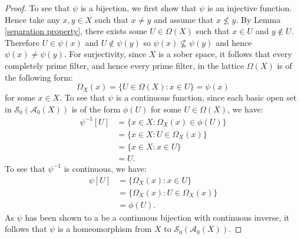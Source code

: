 \documentclass{amsart}
\theoremstyle{plain}
\theoremstyle{definition}
\begin{document}
\begin{proof}
    To see that $\psi$ is a bijection, we first show that $\psi$ is an injective function. Hence take any $x,y\in X$ such that $x\not=y$ and assume that $x\not\leqslant y$. By Lemma \ref{separation property}, there exists some $U\in\Omega(X)$ such that $x\in U$ and $y\not\in U$. Therefore $U\in\psi(x)$ and $U\not\in\psi(y)$ so $\psi(x)\not\subseteq\psi(y)$ and hence $\psi(x)\not=\psi(y)$. For surjectivity, since $X$ is a sober space, it follows that every completely prime filter, and hence every prime filter, in the lattice $\Omega(X)$ is of the following form:  
    \[\Omega_X(x)=\{U\in\Omega(X):x\in U\}=\psi(x)\] for some $x\in X$. To see that $\psi$ is a continuous function, since each basic open set in $\mathcal{S}_0(\mathcal{A}_0(X))$ is of the form $\phi(U)$ for some $U\in\Omega(X)$, we have: 
    \begin{align*}
        \psi^{-1}[U]&=\{x\in X:\Omega_X(x)\in\phi(U)\}\\&=\{x\in X:U\in\Omega_X(x)\}\\&=\{x\in X:x\in U\}\\&=U.
    \end{align*}
    To see that $\psi^{-1}$ is continuous, we have: 
\begin{align*}
    \psi[U]&=\{\Omega_X(x):x\in U\}\\&=\{\Omega_X(x):U\in\Omega_X(x)\}\\&=\phi(U).
\end{align*}
    As $\psi$ has been shown to a be a continuous bijection with continuous inverse, it follows that $\psi$ is a homeomorphism from $X$ to $\mathcal{S}_0(\mathcal{A}_0(X))$. 
\end{proof}
\end{document}
